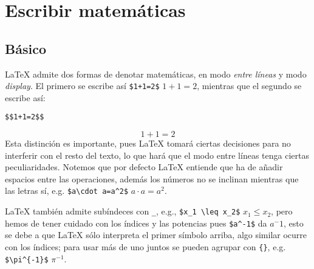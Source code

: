 \chapter{Escribir matemáticas}
\label{sec:maths}
\section{Básico}
\LaTeX{} admite dos formas de denotar matemáticas, en modo \textit{entre líneas} y modo \textit{display}. El primero se escribe así \lstinline|$1+1=2$| $1+1=2$, mientras que el segundo se escribe así:
\begin{lstlisting}
$$1+1=2$$
\end{lstlisting}
$$1+1=2$$
Esta distinción es importante, pues \LaTeX{} tomará ciertas decisiones para no interferir con el resto del texto, lo que hará que el modo entre líneas tenga ciertas peculiaridades. Notemos que por defecto \LaTeX{} entiende que ha de añadir espacios entre las operaciones, además los números no se inclinan mientras que las letras sí, e.g. \lstinline|$a\cdot a=a^2$| $a\cdot a=a^2$.

\LaTeX{} también admite subíndeces con \texttt{\_}, e.g., \lstinline|$x_1 \leq x_2$| $x_1 \leq x_2$, pero hemos de tener cuidado con los índices y las potencias pues \lstinline|$a^-1$| da $a^-1$, esto se debe a que \LaTeX{} sólo interpreta el primer símbolo arriba, algo similar ocurre con los índices; para usar más de uno juntos se pueden agrupar con \texttt{\{\}}, e.g. \lstinline|$\pi^{-1}$| $\pi^{-1}$.

